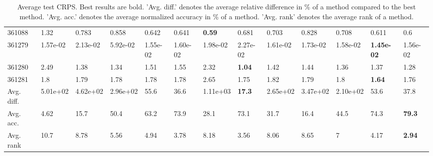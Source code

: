 \begin{table}[ht!]
\begin{tabular}{lllllllllllll}
  361088 & 1.32 & 0.783 & 0.858 & 0.642 & 0.641 & \textbf{0.59} & 0.681 & 0.703 & 0.828 & 0.708 & 0.611 & 0.6 \\ 
  361279 & 1.57e-02 & 2.13e-02 & 5.92e-02 & 1.55e-02 & 1.60e-02 & 1.98e-02 & 2.27e-02 & 1.61e-02 & 1.73e-02 & 1.58e-02 & \textbf{1.45e-02} & 1.56e-02 \\ 
  361280 & 2.49 & 1.38 & 1.34 & 1.51 & 1.55 & 2.32 & \textbf{1.04} & 1.42 & 1.44 & 1.36 & 1.37 & 1.28 \\ 
  361281 & 1.8 & 1.79 & 1.78 & 1.78 & 1.78 & 2.65 & 1.75 & 1.82 & 1.79 & 1.8 & \textbf{1.64} & 1.76 \\ 
   \hline
Avg. diff. & 5.01e+02 & 4.62e+02 & 2.96e+02 & 55.6 & 36.6 & 1.11e+03 & \textbf{17.3} & 2.65e+02 & 3.47e+02 & 2.10e+02 & 53.6 & 37.8 \\ 
  Avg. acc. & 4.62 & 15.7 & 50.4 & 63.2 & 73.9 & 28.1 & 73.1 & 31.7 & 16.4 & 44.5 & 74.3 & \textbf{79.3} \\ 
  Avg. rank & 10.7 & 8.78 & 5.56 & 4.94 & 3.78 & 8.18 & 3.56 & 8.06 & 8.65 & 7 & 4.17 & \textbf{2.94} \\ 
   \hline
\hline
\end{tabular}
\endgroup
\caption{Average test CRPS. 
                  Best results are bold. 
                  'Avg. diff.' denotes the average relative difference in \% of a method compared to the best method.
                  'Avg. acc.' denotes the average normalized accuracy in \% of a method.
                  'Avg. rank' denotes the average rank of a method.} 
\label{TABLES/table_results_CRPS_mahalanobis}
\end{table}
